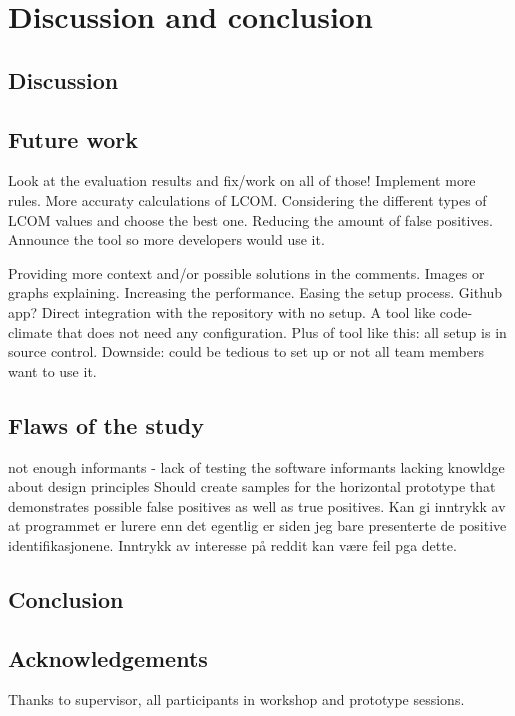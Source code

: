 \documentclass{report}
\begin{document}
\chapter{Discussion and conclusion}
\label{discussion}

\section{Discussion}

\section{Future work}
Look at the evaluation results and fix/work on all of those! 
Implement more rules. More accuraty calculations of LCOM. Considering the different types of LCOM values and choose the best one.
Reducing the amount of false positives.
Announce the tool so more developers would use it.

Providing more context and/or possible solutions in the comments. Images or graphs explaining.
Increasing the performance.
Easing the setup process. Github app? Direct integration with the repository with no setup. A tool like code-climate that does not need any configuration. Plus of tool like this: all setup is in source control. Downside: could be tedious to set up or not all team members want to use it.
\section{Flaws of the study}
\label{flaws-of-study}
not enough informants - lack of testing the software
informants lacking knowldge about design principles
Should create samples for the horizontal prototype that demonstrates possible false positives as well as true positives. Kan gi inntrykk av at programmet er lurere enn det egentlig er siden jeg bare presenterte de positive identifikasjonene. Inntrykk av interesse på reddit kan være feil pga dette.

\section{Conclusion}
\label{conclusion}

\section{Acknowledgements}
\label{acknowledgements}
Thanks to supervisor, all participants in workshop and prototype sessions.

\printbibliography

\appendix
\label{appendix}

\end{document}
